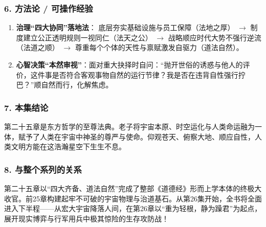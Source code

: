\subsubsection{6. 方法论 / 可操作经验}
\begin{enumerate}
    \item \textbf{治理“四大协同”落地法}：
    底层夯实基础设施与员工保障（法地之厚） $\rightarrow$ 制度建立公正透明规则一视同仁（法天之公） $\rightarrow$ 战略顺应时代大势不强行逆流（法道之顺） $\rightarrow$ 尊重每个个体的天性与禀赋激发自驱力（道法自然）。
    \item \textbf{心智决策“本然审视”}：面对重大抉择时自问：“抛开世俗的诱惑与他人的评价，这件事是否符合客观事物自然的运行节律？我是否在违背自性强行拧巴？”顺自然而行，化解焦虑。
\end{enumerate}

\subsubsection{7. 本集结论}
第二十五章是东方哲学的至尊法典。老子将宇宙本原、时空运化与人类命运融为一体，赋予了人类在宇宙中神圣的尊严与使命。仰观苍天、俯察大地、顺应自性，人类文明方能在这浩瀚星空下生生不息。

\subsubsection{8. 与整个系列的关系}
第二十五章以“四大齐备、道法自然”完成了整部《道德经》形而上学本体的终极大收官。前25章构建起牢不可破的宇宙物理与治道基石。从第26集开始，全书将全面进入下半程——从宏大宇宙降落人间，在第26章以“重为轻根，静为躁君”为起点，展开现实博弈与行军用兵中极其惊险的生存攻防战！